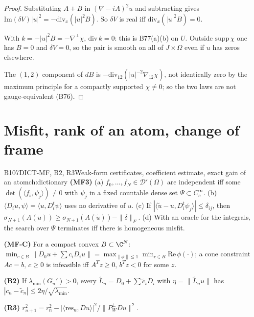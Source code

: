 \begin{proof}
Substituting $A+B$ in $(\nabla-iA)^2u$ and subtracting gives $\mathrm{Im}(\delta V)|u|^2=-\mathrm{div}_x(|u|^2B)$. So $\delta V$ is real iff $\mathrm{div}_x(|u|^2B)=0$.

With $k=-|u|^2B=-\nabla^\perp\chi$, $\mathrm{div}\,k=0$: this is B77(a)(b) on $U$. Outside $\mathrm{supp}\,\chi$ one has $B=0$ and $\delta V=0$, so the pair is smooth on all of $J\times\Omega$ even if $u$ has zeros elsewhere.

The $(1,2)$ component of $dB$ is $-\mathrm{div}_{12}(|u|^{-2}\nabla_{12}\chi)$, not identically zero by the maximum principle for a compactly supported $\chi\ne0$; so the two laws are not gauge-equivalent (B76).

\end{proof}

\section{Misfit, rank of an atom, change of frame}

\begin{dimcard}{B107}{DICT-MF, B2, R3}{Weak-form certificates, coefficient estimate, exact gain of an atom}{\pw}{ch:dictionary}
\textbf{(MF3)} (a) $f_0,\dots,f_N\in\mathcal D'(\Omega)$ are independent iff some $\det(\langle f_i,\psi_j\rangle)\ne0$ with $\psi_j$ in a fixed countable dense set $\Psi\subset C^\infty_c$. (b) $\langle D_iu,\psi\rangle=\langle u,D_i^t\psi\rangle$ uses no derivative of $u$. (c) If $|\langle\tilde u-u,D_i^t\psi_j\rangle|\le\delta_{ij}$, then $\sigma_{N+1}(A(u))\ge\sigma_{N+1}(A(\tilde u))-\|\delta\|_F$. (d) With an oracle for the integrals, the search over $\Psi$ terminates iff there is homogeneous misfit.

\textbf{(MF-C)} For a compact convex $B\subset\C^N$: $\min_{c\in B}\|D_0u+\sum c_iD_iu\|=\max_{\|\phi\|\le1}\min_{c\in B}\mathrm{Re}\,\phi(\cdot)$; a cone constraint $Ac=b$, $c\ge0$ is infeasible iff $A^Tz\ge0$, $b^Tz<0$ for some $z$.

\textbf{(B2)} If $\lambda_{\min}(G_n')>0$, every $\tilde L_n=D_0+\sum\tilde c_iD_i$ with $\eta=\|\tilde L_nu\|$ has $|c_n-\tilde c_n|\le2\eta/\sqrt{\lambda_{\min}}$.

\textbf{(R3)} $r_{n+1}^2=r_n^2-|\langle\mathrm{res}_n,Du\rangle|^2/\|P_W^\perp Du\|^2$.
\end{dimcard}

